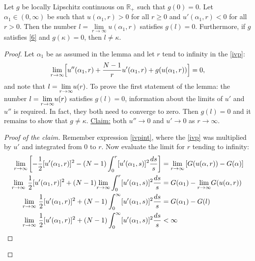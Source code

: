 \begin{lemma}\label{llemma} 
Let $g$ be locally Lipschitz continuous on $\mathbb{R_+}$ such that $g(0)=0$. Let $\alpha_1\in(0,\infty)$ be such that $u(\alpha_1,r)>0$ for all $r\geq0$ and $u'(\alpha_1,r)<0$ for all $r>0$. Then the number $l=\underset{r\to\infty}{\lim}u(\alpha_1,r)$ satisfies $g(l)=0$. Furthermore, if $g$ satisfies \eqref{6} and $g(\kappa)=0$, then $l\neq\kappa$.
\end{lemma}
\begin{proof}
Let $\alpha_1$ be as assumed in the lemma and let $r$ tend to infinity in the \eqref{ivp}:
\begin{equation}\label{ivplim}\underset{r\to\infty}{\lim}\Big[u''(\alpha_1,r)+\frac{N-1}{r}u'(\alpha_1,r)+g(u(\alpha_1,r))\Big]=0,\end{equation} and note that $l=\underset{r\to\infty}{\lim} u(r)$. To prove the first statement of the lemma: the number $l=\underset{r\to\infty}{\lim} u(r)$ satisfies $g(l)=0$, information about the limits of $u'$ and $u''$ is required. In fact, they both need to converge to zero. Then $g(l)=0$ and it remains to show that $g\neq\kappa$. \underline{Claim:} both $u''\to0$ and $u'\to0$ as $r\to\infty.$
\begin{proof}[Proof of the claim] Remember expression \eqref{ivpint}, where the \eqref{ivp} was multiplied by $u'$ and integrated from 0 to $r$. Now evaluate the limit for $r$ tending to infinity: 
\begin{align*}
	\underset{r\to\infty}{\lim}\left[-\frac{1}{2}[u'(\alpha_1,r)]^2-(N-1)\int_0^r[u'(\alpha_1,s)]^2\frac{ds}{s}\right]
        &=\limrtoinf\left[G(u(\alpha,r))-G(\alpha)\right] \\
    \underset{r\to\infty}{\lim}~\frac{1}{2}[u'(\alpha_1,r)]^2+(N-1)\underset{r\to\infty}{\lim}\int_0^r[u'(\alpha_1,s)]^2\frac{ds}{s}
        &=G(\alpha_1)-\underset{r\to\infty}{\lim}G(u(\alpha,r))\\
    \underset{r\to\infty}{\lim}~\frac{1}{2}[u'(\alpha_1,r)]^2+(N-1)\int_0^\infty[u'(\alpha_1,s)]^2\frac{ds}{s}
        &=G(\alpha_1)-G(l)\\
    \underset{r\to\infty}{\lim}~\frac{1}{2}[u'(\alpha_1,r)]^2+(N-1)\int_0^\infty[u'(\alpha_1,s)]^2\frac{ds}{s}
        &<\infty

\end{align*}
\end{proof}
\end{proof}
